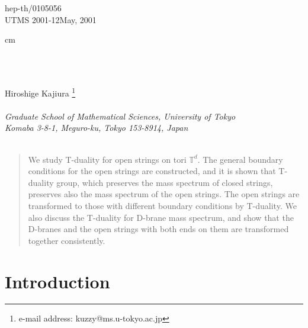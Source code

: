 \documentclass[a4paper,12pt]{article}
\newcommand{\T}{{\mathbb{T}}}
\begin{document}
\begin{titlepage}
\thispagestyle{empty}
\begin{flushleft}
\hfill hep-th/0105056\\
UTMS 2001-12\hfill May, 2001 \\
\end{flushleft}

 cm


\begin{center}
\\
\noindent{
 }\\
\renewcommand{\thefootnote}{\fnsymbol{footnote}}


\vskip 2cm
{\large 
Hiroshige Kajiura 
\footnote{e-mail address: kuzzy@ms.u-tokyo.ac.jp}\\

\noindent{ \bigskip }\\

\it
Graduate School of Mathematical Sciences, University of Tokyo \\
Komaba 3-8-1, Meguro-ku, Tokyo 153-8914, Japan\\
\noindent{\smallskip  }\\
}

\bigskip
\end{center}
\begin{abstract}
We study T-duality for open strings on tori $\T^d$. The general boundary 
conditions for the open strings are constructed, and it is shown that 
T-duality group, which preserves
 the mass spectrum of closed strings, preserves also the mass spectrum
 of the open strings. The open strings are transformed to 
those with different boundary conditions by T-duality. We also discuss the 
T-duality for D-brane mass spectrum, and show that the D-branes and 
the open strings with both ends on them are transformed together 
consistently.

\end{abstract}
\vfill

\end{titlepage}
\vfill
\setcounter{footnote}{0}
\renewcommand{\thefootnote}{\arabic{footnote}}
\newpage


\section{Introduction}
\end{document}
